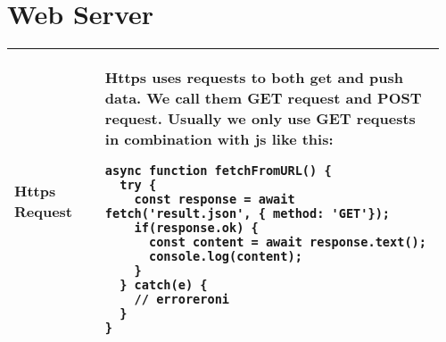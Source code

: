 \documentclass[main.tex,fontsize=8pt,paper=a4,paper=portrait,DIV=calc,]{scrartcl}
\begin{document}
\begin{table}[ht!]
\section{Web Server}
\begin{tabular}{|m{0.2\linewidth}|m{0.755\linewidth}|}
\hline
Https Request & 
Https uses requests to both get and push data.\newline
We call them \textbf{GET request} and \textbf{POST request}.\newline
Usually we only use GET requests in combination with js like this:\newline
\begin{lstlisting}
async function fetchFromURL() {
  try {
    const response = await fetch('result.json', { method: 'GET'});
    if(response.ok) {
      const content = await response.text();
      console.log(content);
    }
  } catch(e) {
    // erroreroni
  }
}
\end{lstlisting}\\
\hline

\hline

\hline

\hline

\hline

\hline

\hline

\hline

\hline
\end{tabular}
\end{table}
\pagebreak
\begin{table}[ht!]
\begin{tabular}{|m{0.2\linewidth}|m{0.755\linewidth}|}
\hline

\hline

\hline

\hline

\hline

\hline

\hline

\hline

\hline

\hline
\end{tabular}
\end{table}
\end{document}

